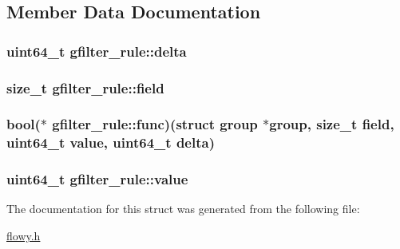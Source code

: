 \subsection{\-Member \-Data \-Documentation}
\hypertarget{structgfilter__rule_ae47654d128d6875cd1e209bdada7612e}{
\subsubsection[{delta}]{\setlength{\rightskip}{0pt plus 5cm}uint64\-\_\-t {\bf gfilter\-\_\-rule\-::delta}}}\label{structgfilter__rule_ae47654d128d6875cd1e209bdada7612e}
\hypertarget{structgfilter__rule_aca87db908ffde91cbf51b2e640738ce1}{
\subsubsection[{field}]{\setlength{\rightskip}{0pt plus 5cm}size\-\_\-t {\bf gfilter\-\_\-rule\-::field}}}\label{structgfilter__rule_aca87db908ffde91cbf51b2e640738ce1}
\hypertarget{structgfilter__rule_a7ae6e6b2e4d4a6398b1a035577ee583a}{
\subsubsection[{func}]{\setlength{\rightskip}{0pt plus 5cm}bool($\ast$ {\bf gfilter\-\_\-rule\-::func})(struct {\bf group} $\ast${\bf group}, size\-\_\-t {\bf field}, uint64\-\_\-t {\bf value}, uint64\-\_\-t {\bf delta})}}\label{structgfilter__rule_a7ae6e6b2e4d4a6398b1a035577ee583a}
\hypertarget{structgfilter__rule_a535d5fcb689e8998a09022bc0dd106b4}{
\subsubsection[{value}]{\setlength{\rightskip}{0pt plus 5cm}uint64\-\_\-t {\bf gfilter\-\_\-rule\-::value}}}\label{structgfilter__rule_a535d5fcb689e8998a09022bc0dd106b4}


\-The documentation for this struct was generated from the following file\-:\begin{DoxyCompactItemize}
\item 
\hyperlink{flowy_8h}{flowy.\-h}\end{DoxyCompactItemize}
